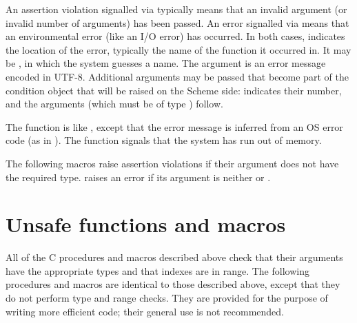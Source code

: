 \noindent{}An assertion violation signalled via
 typically means that an invalid
argument (or invalid number of arguments) has been passed.  An error
signalled via  means that an environmental error
(like an I/O error) has occurred.  In both cases,  indicates
the location of the error, typically the name of the function it
occurred in.  It may be , in which the system guesses a
name.  The  argument is an error message encoded in
UTF-8.  Additional arguments may be passed that become part of the
condition object that will be raised on the Scheme side: 
indicates their number, and the arguments (which must be of type
) follow.

The  function is like , except
that the error message is inferred from an OS error code (as in
).  The  function
signals that the system has run out of memory.

The following macros raise assertion violations if their argument does
not have the required type.   raises an
error if its argument is neither  or .

\begin{protos}
\end{protos}

\section{Unsafe functions and macros}

All of the C procedures and macros described above check that their
 arguments have the appropriate types and that indexes are in range.
The following procedures and macros are identical to those described
 above, except that they do not perform type and range checks.
They are provided for the purpose of writing more efficient code;
 their general use is not recommended.

